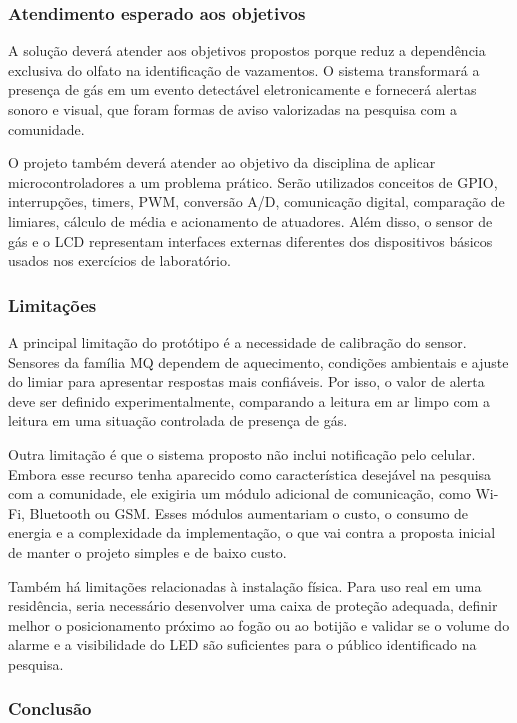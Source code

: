 \documentclass[11pt,a4paper]{article}
\numberwithin{equation}{section}
\begin{document}
\subsubsection{Atendimento esperado aos objetivos}

A solução deverá atender aos objetivos propostos porque reduz a dependência exclusiva do olfato na
identificação de vazamentos. O sistema transformará a presença de gás em um evento detectável
eletronicamente e fornecerá alertas sonoro e visual, que foram formas de aviso valorizadas na pesquisa
com a comunidade.

O projeto também deverá atender ao objetivo da disciplina de aplicar microcontroladores a um problema
prático. Serão utilizados conceitos de GPIO, interrupções, timers, PWM, conversão A/D, comunicação
digital, comparação de limiares, cálculo de média e acionamento de atuadores. Além disso, o sensor de
gás e o LCD representam interfaces externas diferentes dos dispositivos básicos usados nos exercícios
de laboratório.

\subsubsection{Limitações}

A principal limitação do protótipo é a necessidade de calibração do sensor. Sensores da família MQ
dependem de aquecimento, condições ambientais e ajuste do limiar para apresentar respostas mais
confiáveis. Por isso, o valor de alerta deve ser definido experimentalmente, comparando a leitura em
ar limpo com a leitura em uma situação controlada de presença de gás.

Outra limitação é que o sistema proposto não inclui notificação pelo celular. Embora esse recurso
tenha aparecido como característica desejável na pesquisa com a comunidade, ele exigiria um módulo
adicional de comunicação, como Wi-Fi, Bluetooth ou GSM. Esses módulos aumentariam o custo, o consumo
de energia e a complexidade da implementação, o que vai contra a proposta inicial de manter o projeto
simples e de baixo custo.

Também há limitações relacionadas à instalação física. Para uso real em uma residência, seria
necessário desenvolver uma caixa de proteção adequada, definir melhor o posicionamento próximo ao
fogão ou ao botijão e validar se o volume do alarme e a visibilidade do LED são suficientes para o
público identificado na pesquisa.

\subsubsection{Conclusão}
\end{document}
